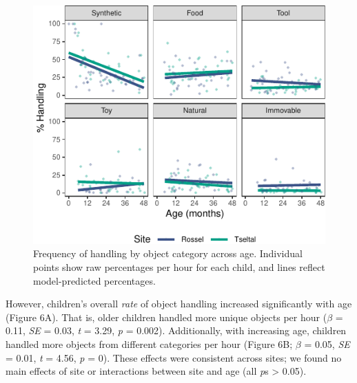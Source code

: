 \documentclass[10pt, letterpaper]{article}
\newenvironment{CodeChunk}{}{}
\begin{document}
\begin{CodeChunk}
\begin{figure}[!ht]

{\centering \includegraphics{figs/age-effects-bycategory-fig-1} 

}

\caption[Frequency of handling by object category across age]{Frequency of handling by object category across age. Individual points show raw percentages per hour for each child, and lines reflect model-predicted percentages.}\label{fig:age-effects-bycategory-fig}
\end{figure}
\end{CodeChunk}

However, children's overall \emph{rate} of object handling increased
significantly with age (Figure 6A). That is, older children handled more
unique objects per hour (\(\beta\) = 0.11, \emph{SE} = 0.03, \emph{t} =
3.29, \emph{p} = 0.002). Additionally, with increasing age, children
handled more objects from different categories per hour (Figure 6B;
\(\beta\) = 0.05, \emph{SE} = 0.01, \emph{t} = 4.56, \emph{p} = 0).
These effects were consistent across sites; we found no main effects of
site or interactions between site and age (all \emph{p}s \textgreater{}
0.05).
\end{document}
